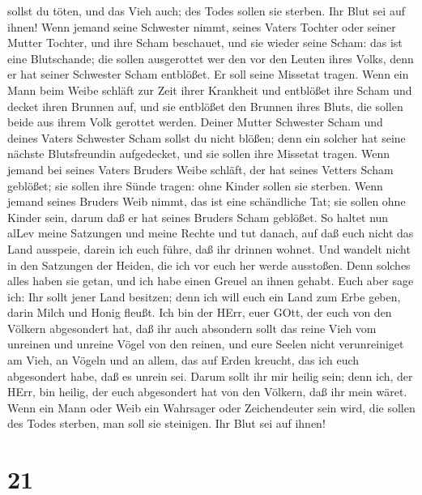 sollst du töten, und das Vieh auch; des Todes sollen sie sterben. Ihr
Blut sei auf ihnen!  Wenn jemand seine Schwester nimmt,
seines Vaters Tochter oder seiner Mutter Tochter, und ihre Scham
beschauet, und sie wieder seine Scham: das ist eine Blutschande; die
sollen ausgerottet wer den vor den Leuten ihres Volks, denn er hat
seiner Schwester Scham entblößet. Er soll seine Missetat tragen.
 Wenn ein Mann beim Weibe schläft zur Zeit ihrer Krankheit
und entblößet ihre Scham und decket ihren Brunnen auf, und sie entblößet
den Brunnen ihres Bluts, die sollen beide aus ihrem Volk gerottet
werden.  Deiner Mutter Schwester Scham und deines Vaters
Schwester Scham sollst du nicht blößen; denn ein solcher hat seine
nächste Blutsfreundin aufgedecket, und sie sollen ihre Missetat tragen.
 Wenn jemand bei seines Vaters Bruders Weibe schläft, der
hat seines Vetters Scham geblößet; sie sollen ihre Sünde tragen: ohne
Kinder sollen sie sterben.  Wenn jemand seines Bruders Weib
nimmt, das ist eine schändliche Tat; sie sollen ohne Kinder sein, darum
daß er hat seines Bruders Scham geblößet.  So haltet nun
alLev meine Satzungen und meine Rechte und tut danach, auf daß euch
nicht das Land ausspeie, darein ich euch führe, daß ihr drinnen wohnet.
 Und wandelt nicht in den Satzungen der Heiden, die ich vor
euch her werde ausstoßen. Denn solches alles haben sie getan, und ich
habe einen Greuel an ihnen gehabt.  Euch aber sage ich: Ihr
sollt jener Land besitzen; denn ich will euch ein Land zum Erbe geben,
darin Milch und Honig fleußt. Ich bin der HErr, euer GOtt, der euch von
den Völkern abgesondert hat,  daß ihr auch absondern sollt
das reine Vieh vom unreinen und unreine Vögel von den reinen, und eure
Seelen nicht verunreiniget am Vieh, an Vögeln und an allem, das auf
Erden kreucht, das ich euch abgesondert habe, daß es unrein sei.
 Darum sollt ihr mir heilig sein; denn ich, der HErr, bin
heilig, der euch abgesondert hat von den Völkern, daß ihr mein wäret.
 Wenn ein Mann oder Weib ein Wahrsager oder Zeichendeuter
sein wird, die sollen des Todes sterben, man soll sie steinigen. Ihr
Blut sei auf ihnen!

\hypertarget{section-20}{%
\section{21}\label{section-20}}


